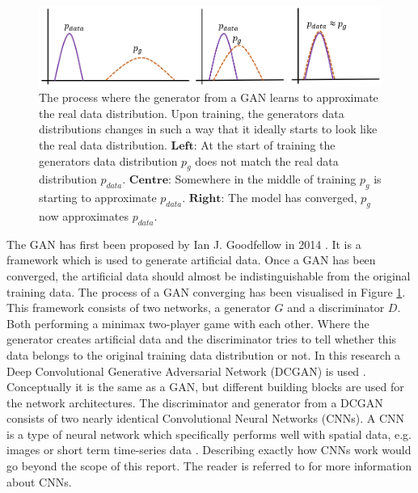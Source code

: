 \begin{figure} [!htb]
    \centering
    \includegraphics[scale=0.5]{figuren/gan real fake distributions learning.png}
    \caption{The process where the generator from a GAN learns to approximate the real data distribution. Upon training, the generators data distributions changes in such a way that it ideally starts to look like the real data distribution. $\textbf{Left}$: At the start of training the generators data distribution $p_g$ does not match the real data distribution $p_{data}$. $\textbf{Centre}$: Somewhere in the middle of training $p_{g}$ is starting to approximate $p_{data}$. $\textbf{Right}$: The model has converged, $p_g$ now approximates $p_{data}$.}
    \label{fig:gan_training_distributions}
\end{figure}
The GAN has first been proposed by Ian J. Goodfellow in 2014 \cite{goodfellow2014generative}. It is a framework which is used to generate artificial data. Once a GAN has been converged, the artificial data should almost be indistinguishable from the original training data. The process of a GAN converging has been visualised in Figure \ref{fig:gan_training_distributions}. This framework consists of two networks, a generator $G$ and a discriminator $D$. Both performing a minimax two-player game with each other. Where the generator creates artificial data and the discriminator tries to tell whether this data belongs to the original training data distribution or not.
In this research a Deep Convolutional Generative Adversarial Network (DCGAN) is used \cite{radford2015unsupervised}. Conceptually it is the same as a GAN, but different building blocks are used for the network architectures. The discriminator and generator from a DCGAN consists of two nearly identical Convolutional Neural Networks (CNNs). A CNN is a type of neural network which specifically performs well with spatial data, e.g. images or short term time-series data \cite{dumoulin2016guide}. Describing exactly how CNNs work would go beyond the scope of this report. The reader is referred to \cite{dumoulin2016guide} for more information about CNNs.

